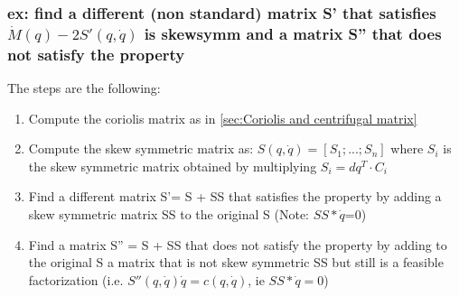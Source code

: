 \documentclass[a4paper,12pt]{article}
\begin{document}
\subsubsection{ex: find a different (non standard) matrix S' 
that satisfies $\dot{M}(q)-2S'(q,\dot{q})$ is skewsymm and a matrix S''
that does not satisfy the property}
The steps are the following:
\begin{enumerate}
    \item Compute the coriolis matrix as in \ref{sec:Coriolis and centrifugal matrix}
    \item Compute the skew symmetric matrix as: $S(q,\dot{q}) = [S_1;...;S_n]$ where $S_i$ is 
    the skew symmetric matrix obtained by multiplying $S_i = dq^T \cdot C_i$
    \item Find a different matrix S'= S + SS that satisfies the property by adding 
    a skew symmetric matrix SS to the original S (Note: $SS*\dot{q}$=0)
    \item Find a matrix S'' = S + SS that does not satisfy the property
    by adding to the original S a matrix that is not skew symmetric SS
    but still is a feasible factorization (i.e. $S''(q,\dot{q}) \dot{q} 
    = c(q,\dot{q})$, ie $SS*\dot{q} = 0$)
\end{enumerate}
\end{document}
